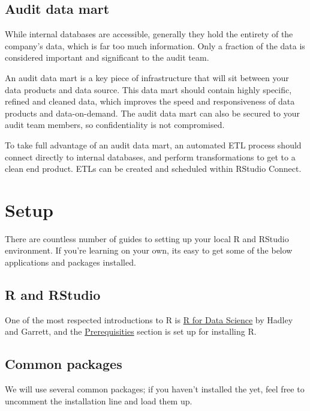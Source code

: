 \documentclass[
]{book}
\begin{document}
\hypertarget{audit-data-mart}{%
\section{Audit data mart}\label{audit-data-mart}}

While internal databases are accessible, generally they hold the entirety of the company's data, which is far too much information. Only a fraction of the data is considered important and significant to the audit team.

An audit data mart is a key piece of infrastructure that will sit between your data products and data source. This data mart should contain highly specific, refined and cleaned data, which improves the speed and responsiveness of data products and data-on-demand. The audit data mart can also be secured to your audit team members, so confidentiality is not compromised.

To take full advantage of an audit data mart, an automated ETL process should connect directly to internal databases, and perform transformations to get to a clean end product. ETLs can be created and scheduled within RStudio Connect.

\hypertarget{setup}{%
\chapter{Setup}\label{setup}}

There are countless number of guides to setting up your local R and RStudio environment. If you're learning on your own, its easy to get some of the below applications and packages installed.

\hypertarget{r-and-rstudio-1}{%
\section{R and RStudio}\label{r-and-rstudio-1}}

One of the most respected introductions to R is \href{https://r4ds.had.co.nz/introduction.html}{R for Data Science} by Hadley and Garrett, and the \href{https://r4ds.had.co.nz/introduction.html\#prerequisites}{Prerequisities} section is set up for installing R.

\hypertarget{common-packages}{%
\section{Common packages}\label{common-packages}}

We will use several common packages; if you haven't installed the yet, feel free to uncomment the installation line and load them up.
\end{document}
